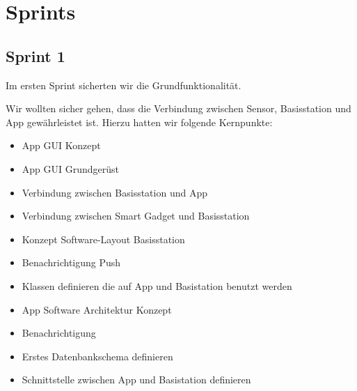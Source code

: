 \section{Sprints}


\subsection{Sprint 1}
Im ersten Sprint sicherten wir die Grundfunktionalität. 

Wir wollten sicher gehen, dass die Verbindung zwischen Sensor, Basisstation und App gewährleistet ist. Hierzu hatten wir folgende Kernpunkte:
\begin{itemize}
	\item App GUI Konzept 
	\item App GUI Grundgerüst
	\item Verbindung zwischen Basisstation und App
	\item Verbindung zwischen Smart Gadget und Basisstation
	\item Konzept Software-Layout Basisstation
	\item Benachrichtigung Push
	\item Klassen definieren die auf App und Basistation benutzt werden
	\item App Software Architektur Konzept
	\item Benachrichtigung
	\item Erstes Datenbankschema definieren
	\item Schnittstelle zwischen App und Basistation definieren
\end{itemize}

